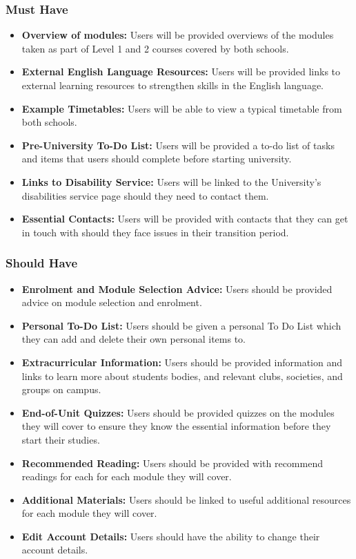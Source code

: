 \documentclass{l4proj}
\begin{document}
\subsubsection{Must Have}
\begin{itemize}
    \item \textbf{Overview of modules:} Users will be provided overviews of the modules taken as part of Level 1 and 2 courses covered by both schools.
    \item \textbf{External English Language Resources:} Users will be provided links to external learning resources to strengthen skills in the English language.
    \item \textbf{Example Timetables:} Users will be able to view a typical timetable from both schools.
    \item \textbf{Pre-University To-Do List:} Users will be provided a to-do list of tasks and items that users should complete before starting university.
    \item \textbf{Links to Disability Service:} Users will be linked to the University's disabilities service page should they need to contact them.
    \item \textbf{Essential Contacts:} Users will be provided with contacts that they can get in touch with should they face issues in their transition period.
\end{itemize}

\subsubsection{Should Have}
\begin{itemize}
    \item \textbf{Enrolment and Module Selection Advice:} Users should be provided advice on module selection and enrolment.
    \item \textbf{Personal To-Do List:} Users should be given a personal To Do List which they can add and delete their own personal items to.
    \item \textbf{Extracurricular Information:} Users should be provided information and links to learn more about students bodies,  and relevant clubs,  societies,  and groups on campus.
    \item \textbf{End-of-Unit Quizzes:} Users should be provided quizzes on the modules they will cover to ensure they know the essential information before they start their studies.
    \item \textbf{Recommended Reading:} Users should be provided with recommend readings for each for each module they will cover.
    \item \textbf{Additional Materials:} Users should be linked to useful additional resources for each module they will cover.
    \item \textbf{Edit Account Details:} Users should have the ability to change their account details.
\end{itemize}
\end{document}
